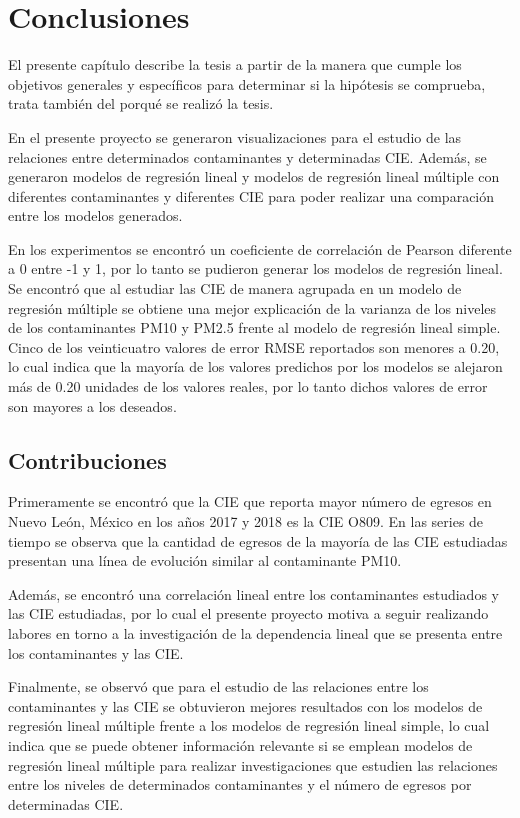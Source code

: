 \chapter{Conclusiones}

El presente capítulo describe la tesis a partir de la manera que cumple los objetivos generales y específicos para determinar si la hipótesis se comprueba, trata también del porqué se realizó la tesis.

En el presente proyecto se generaron visualizaciones para el estudio de las relaciones entre determinados contaminantes y determinadas CIE. Además, se generaron modelos de regresión lineal y modelos de regresión lineal múltiple con diferentes contaminantes y diferentes CIE para poder realizar una comparación entre los modelos generados.

En los experimentos se encontró un coeficiente de correlación de Pearson diferente a 0 entre -1 y 1, por lo tanto se pudieron generar los modelos de regresión lineal. Se encontró que al estudiar las CIE de manera agrupada en un modelo de regresión múltiple se obtiene una mejor explicación de la varianza de los niveles de los contaminantes PM10 y PM2.5 frente al modelo de regresión lineal simple. Cinco de los veinticuatro valores de error RMSE reportados son menores a 0.20, lo cual indica que la mayoría de los valores predichos por los modelos se alejaron más de 0.20 unidades de los valores reales, por lo tanto dichos valores de error son mayores a los deseados.

\section{Contribuciones}
Primeramente se encontró que la CIE que reporta mayor número de egresos en Nuevo León, México en los años 2017 y 2018 es la CIE O809. En las series de tiempo se observa que la cantidad de egresos de la mayoría de las CIE estudiadas presentan una línea de evolución similar al contaminante PM10.

Además, se encontró una correlación lineal entre los contaminantes estudiados y las CIE estudiadas, por lo cual el presente proyecto motiva a seguir realizando labores en torno a la investigación de la dependencia lineal que se presenta entre los contaminantes y las CIE.

Finalmente, se observó que para el estudio de las relaciones entre los contaminantes y las CIE se obtuvieron mejores resultados con los modelos de regresión lineal múltiple frente a los modelos de regresión lineal simple, lo cual indica que se puede obtener información relevante si se emplean modelos de regresión lineal múltiple para realizar investigaciones que estudien las relaciones entre los niveles de determinados contaminantes y el número de egresos por determinadas CIE.

